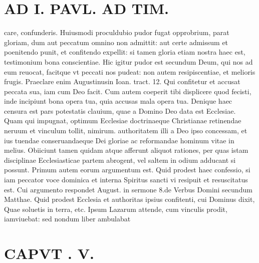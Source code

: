\documentclass{article}
\begin{document}
\begin{pages}
\section*{AD I. PAVL. AD TIM. }
\marginpar{[ p.326 ]}\pstart care, confunderis. Huiusmodi proculdubio pudor fugat opprobrium, parat gloriam, dum aut peccatum omnino non admittit: aut certe admissum et poenitendo punit, et confitendo expellit: si tamen gloria etiam nostra haec est, testimonium bona conscientiae. Hic igitur pudor est secundum Deum, qui nos ad eum reuocat, facitque vt peccati nos pudeat: non autem resipiscentiae, et melioris frugis. Praeclare enim Augustinusin Ioan. tract. 12. Qui confitetur et accusat peccata sua, iam cum Deo facit. Cum autem coeperit tibi displicere quod fecisti, inde incipiunt bona opera tua, quia accusas mala opera tua. Denique haec censura est pars potestatis clauium, quae a Domino Deo data est Ecclesiae. Quam qui impugnat, optimum Ecclesiae doctrinaeque Christianae retinendae neruum et vinculum tollit, nimirum. authoritatem illi a Deo ipso concessam, et ius tuendae conseruandaeque Dei gloriae ac reformandae hominum vitae in melius. Obiiciunt tamen quidam atque afferunt aliquot rationes, per quas istam disciplinae Ecclesiasticae partem abrogent, vel saltem in odium adducant si possunt. Primum autem eorum argumentum est. Quid prodest haec confessio, si iam peccator voce dominica et interna Spiritus sancti vi resipuit et resuscitatus est. Cui argumento respondet August. in sermone 8.de Verbus  Domini secundum Matthae. Quid prodest Ecclesia et authoritas ipsius confitenti, cui Dominus dixit, Quae soluetis in terra, etc. Ipsum Lazarum attende, cum vinculis prodit, iamviuebat: sed nondum liber ambulabat  \pend
\section*{CAPVT . V. }
\marginpar{[ p.27 ]}\pstart {}
{}

\end{pages}
\end{document}
